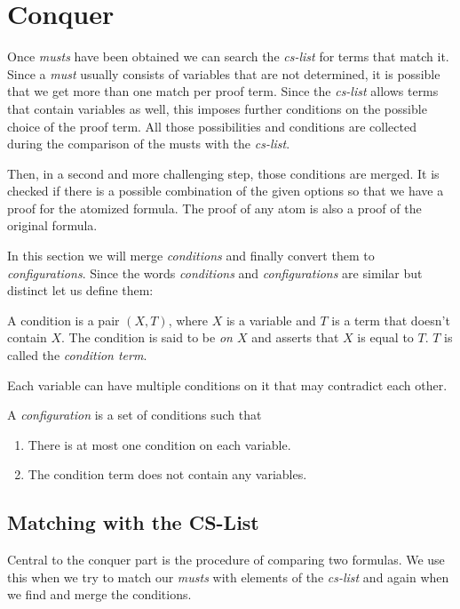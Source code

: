 \section{Conquer}

Once \emph{musts} have been obtained we can search the \emph{cs-list} for terms that match it. Since a \emph{must} usually consists of variables that are not determined, it is possible that we get more than one match per proof term. Since the \emph{cs-list} allows terms that contain variables as well, this imposes further conditions on the possible choice of the proof term. All those possibilities and conditions are collected during the comparison of the musts with the \emph{cs-list}.

Then, in a second and more challenging step, those conditions are merged. It is checked if there is a possible combination of the given options so that we have a proof for the atomized formula. The proof of any atom is also a proof of the original formula.

In this section we will merge \emph{conditions} and finally convert them to \emph{configurations}. Since the words \emph{conditions} and \emph{configurations} are similar but distinct let us define them:

\begin{definition}[condition]
A condition is a pair $(X, T)$, where $X$ is a variable and $T$ is a term that doesn't contain $X$. The condition is said to be \emph{on $X$} and asserts that $X$ is equal to $T$. $T$ is called the \emph{condition term}.
\end{definition}
Each variable can have multiple conditions on it that may contradict each other.

\begin{definition}[configuration]
A \emph{configuration} is a set of conditions such that
\begin{enumerate}
	\item There is at most one condition on each variable.
	\item The condition term does not contain any variables.
\end{enumerate}
\end{definition}

\subsection{Matching with the CS-List}
Central to the conquer part is the procedure of comparing two formulas. We use this when we try to match our \emph{musts} with elements of the \emph{cs-list} and  again when we find and merge the conditions.

